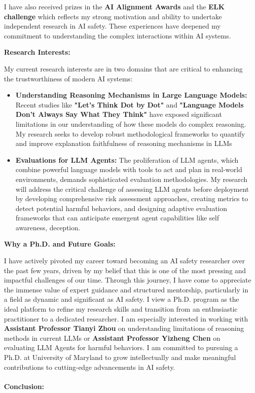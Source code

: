 \documentclass[12pt]{article}
\begin{document}
I have also received prizes in the \textbf{AI Alignment Awards} \cite{alignment_awards} and the \textbf{ELK challenge} \cite{elk_prize} which reflects my strong motivation and ability to undertake independent research in AI safety. These experiences have deepened my commitment to understanding the complex interactions within AI systems.

\textbf{Research Interests:}

My current research interests are in two domains that are critical to enhancing the trustworthiness of modern AI systems:

\begin{itemize}
    \item \textbf{Understanding Reasoning Mechanisms in Large Language Models:} 
    Recent studies like \textbf{"Let's Think Dot by Dot"} \cite{pfau2024} and \textbf{"Language Models Don't Always Say What They Think"} \cite{turpin2023} have exposed significant limitations in our understanding of how these models do complex reasoning. My research seeks to develop robust methodological frameworks to quantify and improve explanation faithfulness of reasoning mechanisms in LLMs
    
    \item \textbf{Evaluations for LLM Agents:}  
    The proliferation of LLM agents, which combine powerful language models with tools to act and plan in real-world environments, demands sophisticated evaluation methodologies. My research will address the critical challenge of assessing LLM agents before deployment by developing comprehensive risk assessment approaches, creating metrics to detect potential harmful behaviors, and designing adaptive evaluation frameworks that can anticipate emergent agent capabilities like self awareness, deception.
    
\end{itemize}

\newpage
\textbf{Why a Ph.D. and Future Goals:}

I have actively pivoted my career toward becoming an AI safety researcher over the past few years, driven by my belief that this is one of the most pressing and impactful challenges of our time. Through this journey, I have come to appreciate the immense value of expert guidance and structured mentorship, particularly in a field as dynamic and significant as AI safety. I view a Ph.D. program as the ideal platform to refine my research skills and transition from an enthusiastic practitioner to a dedicated researcher. I am especially interested in working with \textbf{Assistant Professor Tianyi Zhou} on understanding limitations of reasoning methods in current LLMs or \textbf{Assistant Professor Yizheng Chen} on evaluating LLM Agents for harmful behaviors. I am committed to pursuing a Ph.D. at University of Maryland to grow intellectually and make meaningful contributions to cutting-edge advancements in AI safety.
\\
\\
\textbf{Conclusion:}
\end{document}
